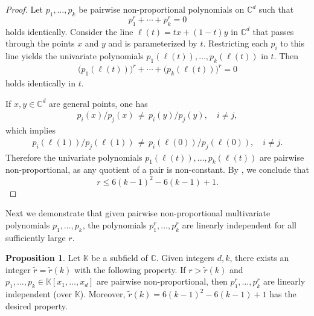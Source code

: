 \documentclass[12pt]{article}
\theoremstyle{definition}
\newtheorem{proposition}[theorem]{Proposition}
\newcommand{\upperboundn}[1]{6{#1}^2-6#1+1}
\newcommand{\kNS}{k}
\begin{document}
\begin{proof}
Let $p_1,\dots, p_k$ be pairwise non-proportional polynomials on $\mathbb{C}^d$ such that
\[
p_1^r+\cdots+p_k^r =0
\]
holds identically.  
Consider the line $\ell(t)=tx+(1-t)y$ in $\mathbb{C}^d$ that  passes through the points $x$ and $y$ and is parameterized by $t$. 
Restricting each $p_i$ to this line yields the univariate polynomials 
$p_1(\ell(t)),\dots,p_k(\ell(t))$ in $t$.
Then
    \begin{align*}
        \big(p_1(\ell(t))\big)^r + \dotsb + \big(p_k(\ell(t))\big)^r = 0
    \end{align*}
holds identically in $t$. 

If  $x,y\in\mathbb{C}^d$ are general points,
one has
    \begin{align*}
    p_i(x)/p_j(x)
    \,\ne\, p_i(y)/p_j(y),\quad {i\neq j},
    \end{align*}
which implies 
    \begin{align*}
    p_i(\ell(1))/p_j(\ell(1))
    \,\ne\,
    p_i(\ell(0))/p_j(\ell(0)),\quad i\neq j.
    \end{align*}   
Therefore the univariate polynomials 
 $p_1(\ell(t)),\dots,p_k(\ell(t))$ are pairwise non-proportional, as any quotient of a pair is non-constant.
  By ,
    we conclude that 
\[r\le \upperboundn{(\kNS-1)}.\]
\end{proof}


 
Next we demonstrate that given pairwise non-proportional multivariate polynomials $p_1,\dotsc,p_k$, the polynomials $p_1^r,\dotsc,p_k^r$ are linearly independent for all sufficiently large $r$. 

\begin{proposition}
\label{proposition:linear-independence}
Let $\mathbb{K}$ be a subfield of $\mathbb{C}$. 
Given integers $d, k$, there exists an integer $\tilde{r}=\tilde{r}(k)$ with the following property. 
If $r>\tilde{r}(k)$ and $p_1,\dots,p_k\in \mathbb{K}[x_1,\dots,x_d]$ are pairwise non-proportional, then $p_1^r,\dots,p_k^r$ are linearly independent (over $\mathbb{K}$). 
Moreover, 
{$\tilde{r}(k) = \upperboundn{(\kNS-1)}$} has the desired property.
\end{proposition}
\end{document}
